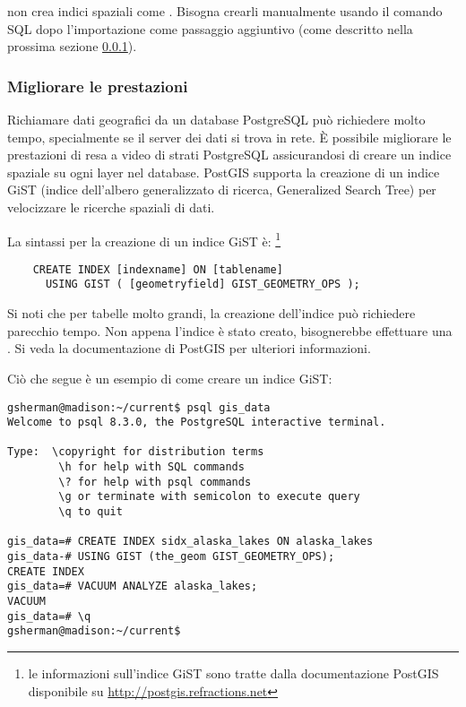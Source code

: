  non crea indici spaziali come . Bisogna
crearli manualmente usando il comando SQL  dopo
l'importazione come passaggio aggiuntivo (come descritto nella prossima
sezione \ref{label_improve}).

\subsubsection{Migliorare le prestazioni} \label{label_improve}

Richiamare dati geografici da un database PostgreSQL può richiedere molto
tempo, specialmente se il server dei dati si trova in rete. È possibile
migliorare le prestazioni di resa a video di strati PostgreSQL assicurandosi
di creare un  indice spaziale su ogni layer nel
database. PostGIS supporta la creazione di un  indice GiST
(indice dell'albero generalizzato di ricerca, Generalized Search Tree) per
velocizzare le ricerche spaziali di dati.

La sintassi per la creazione di un indice GiST è:
\footnote{le informazioni sull'indice GiST
sono tratte dalla documentazione PostGIS disponibile su \url{http://postgis.refractions.net}}

\begin{verbatim}
    CREATE INDEX [indexname] ON [tablename] 
      USING GIST ( [geometryfield] GIST_GEOMETRY_OPS );
\end{verbatim}

Si noti che per tabelle molto grandi, la creazione dell'indice può richiedere
parecchio tempo. Non appena l'indice è stato creato, bisognerebbe effettuare
una . Si veda la documentazione di PostGIS
\cite{PostGISweb} per ulteriori informazioni.

Ciò che segue è un esempio di come creare un indice GiST:
\begin{verbatim}
gsherman@madison:~/current$ psql gis_data
Welcome to psql 8.3.0, the PostgreSQL interactive terminal.

Type:  \copyright for distribution terms
        \h for help with SQL commands
        \? for help with psql commands
        \g or terminate with semicolon to execute query
        \q to quit

gis_data=# CREATE INDEX sidx_alaska_lakes ON alaska_lakes
gis_data-# USING GIST (the_geom GIST_GEOMETRY_OPS);
CREATE INDEX
gis_data=# VACUUM ANALYZE alaska_lakes;
VACUUM
gis_data=# \q
gsherman@madison:~/current$
\end{verbatim}

